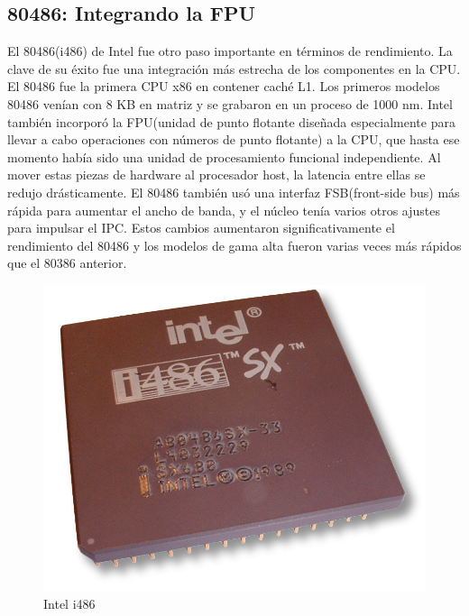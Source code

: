 \subsection{80486: Integrando la FPU}
El 80486(i486) de Intel fue otro paso importante en términos de rendimiento. La clave de su éxito fue una integración más estrecha de los componentes 
en la CPU. El 80486 fue la primera CPU x86 en contener caché L1. Los primeros modelos 80486 venían con 8 KB en matriz y se grabaron en un proceso de 1000 nm.
Intel también incorporó la FPU(unidad de punto flotante diseñada especialmente para llevar a cabo operaciones con números de punto flotante) a la CPU, que hasta ese 
momento había sido una unidad de procesamiento funcional independiente. Al mover estas piezas de hardware al procesador host, la latencia entre ellas se redujo 
drásticamente. El 80486 también usó una interfaz FSB(front-side bus) más rápida para aumentar el ancho de banda, y el núcleo 
tenía varios otros ajustes para impulsar el IPC. Estos cambios aumentaron significativamente el rendimiento del 80486 y los modelos de gama alta fueron varias 
veces más rápidos que el 80386 anterior. 
\begin{figure}[htb]
	\centering
	\includegraphics[scale = 0.15]{Graphics/Intel_80486sx.jpg}
	\caption{Intel i486}
	\label{fig:21}
\end{figure}


